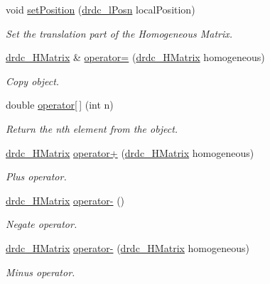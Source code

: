 \begin{CompactItemize}
void \hyperlink{classdrdc__HMatrix_1a7c2f6cb34255c88a40c832a96e5fb3}{setPosition} (\hyperlink{classdrdc__lPosn}{drdc\_\-lPosn} localPosition)
\begin{CompactList}\small\item\em Set the translation part of the Homogeneous Matrix. \item\end{CompactList}\item 
\hyperlink{classdrdc__HMatrix}{drdc\_\-HMatrix} \& \hyperlink{classdrdc__HMatrix_9b19afd1fb7b7fb2f6540c829272f675}{operator=} (\hyperlink{classdrdc__HMatrix}{drdc\_\-HMatrix} homogeneous)
\begin{CompactList}\small\item\em Copy object. \item\end{CompactList}\item 
double \hyperlink{classdrdc__HMatrix_1b54142408745495456f761e509a9d7c}{operator\mbox{[}$\,$\mbox{]}} (int n)
\begin{CompactList}\small\item\em Return the nth element from the object. \item\end{CompactList}\item 
\hyperlink{classdrdc__HMatrix}{drdc\_\-HMatrix} \hyperlink{classdrdc__HMatrix_5da0db87a60d8585c726bb1dbab1a20a}{operator+} (\hyperlink{classdrdc__HMatrix}{drdc\_\-HMatrix} homogeneous)
\begin{CompactList}\small\item\em Plus operator. \item\end{CompactList}\item 
\hyperlink{classdrdc__HMatrix}{drdc\_\-HMatrix} \hyperlink{classdrdc__HMatrix_6c725d25897a9e3e533a064a5b4cd31c}{operator-} ()
\begin{CompactList}\small\item\em Negate operator. \item\end{CompactList}\item 
\hyperlink{classdrdc__HMatrix}{drdc\_\-HMatrix} \hyperlink{classdrdc__HMatrix_7c52fcfd868193a46a491fc6daf7f36f}{operator-} (\hyperlink{classdrdc__HMatrix}{drdc\_\-HMatrix} homogeneous)
\begin{CompactList}\small\item\em Minus operator. \item\end{CompactList}\item 

\end{CompactItemize}
